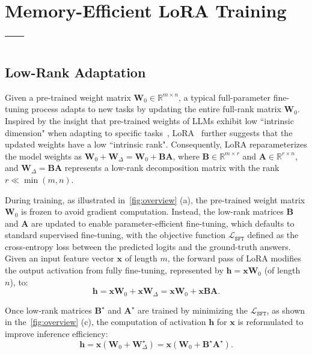 \section{Memory-Efficient LoRA Training --- \method}
\subsection{Low-Rank Adaptation}
Given a pre-trained weight matrix $\mathbf{W}_{0} \in \mathbb{R}^{m \times n}$, a typical full-parameter fine-tuning process adapts to new tasks by updating the entire full-rank matrix $\mathbf{W}_{0}$.
Inspired by the insight that pre-trained weights of LLMs exhibit low ``intrinsic dimension" when adapting to specific tasks~\citep{ghajanyanGZ20}, LoRA~\citep{Edw:2022lora} further suggests that the updated weights 
have a low ``intrinsic rank".
Consequently, LoRA reparameterizes the model weights as $\mathbf{W}_0 + \mathbf{W}_{\Delta} = \mathbf{W}_0 + \mathbf{B}\mathbf{A}$, where $\mathbf{B} \in \mathbb{R}^{m \times r}$ and $\mathbf{A} \in \mathbb{R}^{r \times n}$, and $\mathbf{W}_{\Delta}=\mathbf{B}\mathbf{A}$ represents a low-rank decomposition matrix with the rank $r \ll \min(m, n)$.

During training, as illustrated in~\cref{fig:overview} (a), the pre-trained weight matrix $\mathbf{W}_0$ is frozen to avoid gradient computation. Instead, the low-rank matrices $\mathbf{B}$ and $\mathbf{A}$ are updated to enable parameter-efficient fine-tuning, which defaults to standard supervised fine-tuning, 
with the objective function $\mathcal{L}_\mathtt{SFT}$ defined as the cross-entropy loss between the predicted logits and the ground-truth answers.
Given an input feature vector $\mathbf{x}$ of length $m$, the forward pass of LoRA modifies the output activation from fully fine-tuning, represented by $\mathbf{h}=\mathbf{x}\mathbf{W}_0$ (of length $n$), to:
\begin{equation}
\mathbf{h}
=\mathbf{x} \mathbf{W}_0+\mathbf{x}\mathbf{W}_{\Delta}
=\mathbf{x} \mathbf{W}_0+\mathbf{x}\mathbf{BA}.
\end{equation}

 
Once low-rank matrices $\mathbf{B}^{\star}$ and $\mathbf{A}^{\star}$ are trained by minimizing the $\mathcal{L}_\mathtt{SFT}$, as shown in the~\cref{fig:overview} (c),
the computation of activation $\mathbf{h}$ for $\mathbf{x}$ is reformulated to improve inference efficiency:
\begin{equation}
\mathbf{h}
=\mathbf{x} (\mathbf{W}_0+\mathbf{W}_{\Delta}^{\star})
=\mathbf{x} (\mathbf{W}_0+\mathbf{B}^{\star}\mathbf{A}^{\star}).
\end{equation}

